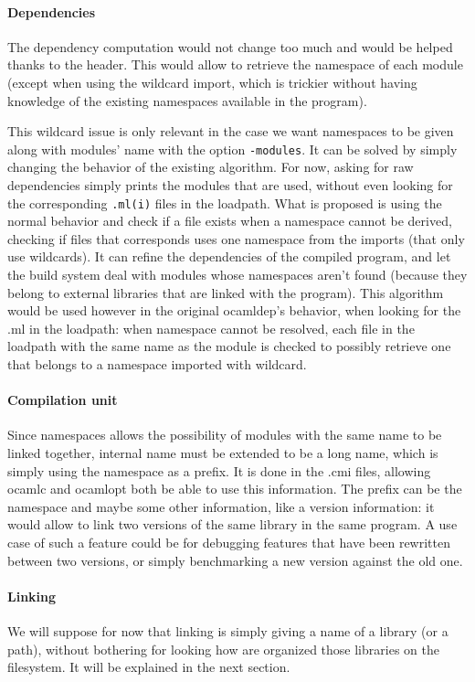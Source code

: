 \documentclass[11pt,a4paper]{article}
\begin{document}
\paragraph{Dependencies}

The dependency computation would not change too much and would be helped thanks
to the header. This would allow to retrieve the namespace of each module (except
when using the wildcard import, which is trickier without having knowledge of
the existing namespaces available in the program).

This wildcard issue is only relevant in the case we want namespaces to be given
along with modules' name with the option \texttt{-modules}. It can be solved by
simply changing the behavior of the existing algorithm. For now, asking for raw
dependencies simply prints the modules that are used, without even looking for
the corresponding \texttt{.ml(i)} files in the loadpath. What is proposed is
using the normal behavior and check if a file exists when a namespace cannot be
derived, checking if files that corresponds uses one namespace from the imports
(that only use wildcards). It can refine the dependencies of the compiled
program, and let the build system deal with modules whose namespaces aren't
found (because they belong to external libraries that are linked with the
program). This algorithm would be used however in the original ocamldep's
behavior, when looking for the .ml in the loadpath: when namespace cannot be
resolved, each file in the loadpath with the same name as the module is checked
to possibly retrieve one that belongs to a namespace imported with wildcard.


\paragraph{Compilation unit}

Since namespaces allows the possibility of modules with the same name to be
linked together, internal name must be extended to be a long name, which is simply
using the namespace as a prefix. It is done in the .cmi files, allowing ocamlc
and ocamlopt both be able to use this information. The prefix can be the
namespace and maybe some other information, like a version information: it would
allow to link two versions of the same library in the same program. A use case
of such a feature could be for debugging features that have been rewritten
between two versions, or simply benchmarking a new version against the old one.


\paragraph{Linking} We will suppose for now that linking is simply giving a name
of a library (or a path), without bothering for looking how are organized those
libraries on the filesystem. It will be explained in the next section.
\end{document}
